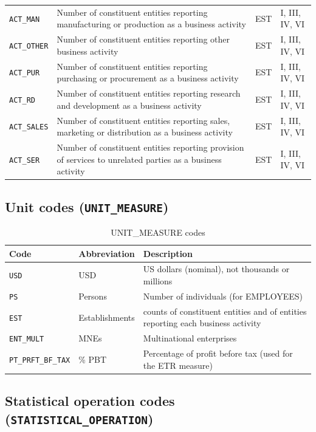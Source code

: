 \documentclass[11pt,a4paper]{article}
\newcommand{\code}[1]{\texttt{#1}}
\begin{document}
\begin{longtable}{@{}lp{6cm}lp{2.5cm}@{}}
\code{ACT\_MAN}  & Number of constituent entities reporting manufacturing or production as a business activity & EST & I, III, IV, VI \\
\code{ACT\_OTHER} & Number of constituent entities reporting other business activity & EST & I, III, IV, VI \\
\code{ACT\_PUR}  & Number of constituent entities reporting purchasing or procurement as a business activity & EST & I, III, IV, VI \\
\code{ACT\_RD}  & Number of constituent entities reporting research and development as a business activity & EST & I, III, IV, VI \\
\code{ACT\_SALES} & Number of constituent entities reporting sales, marketing or distribution as a business activity & EST & I, III, IV, VI \\
\code{ACT\_SER}  & Number of constituent entities reporting provision of services to unrelated parties as a business activity & EST & I, III, IV, VI \\
\end{longtable}

\subsection{Unit codes (\texttt{UNIT\_MEASURE})}

\begin{table}[H]
\centering
\caption{UNIT\_MEASURE codes}
\label{tab:units}
\begin{tabular}{@{}llp{8cm}@{}}
\toprule
Code & Abbreviation & Description \\
\midrule
\code{USD} & USD & US dollars (nominal), not thousands or millions \\
\code{PS} & Persons & Number of individuals (for EMPLOYEES) \\
\code{EST} & Establishments & counts of constituent entities and of entities reporting each business activity \\
\code{ENT\_MULT} & MNEs & Multinational enterprises \\
\code{PT\_PRFT\_BF\_TAX} & \% PBT & Percentage of profit before tax (used for the ETR measure) \\
\bottomrule
\end{tabular}
\end{table}

\subsection{Statistical operation codes (\texttt{STATISTICAL\_OPERATION})}
\end{document}
